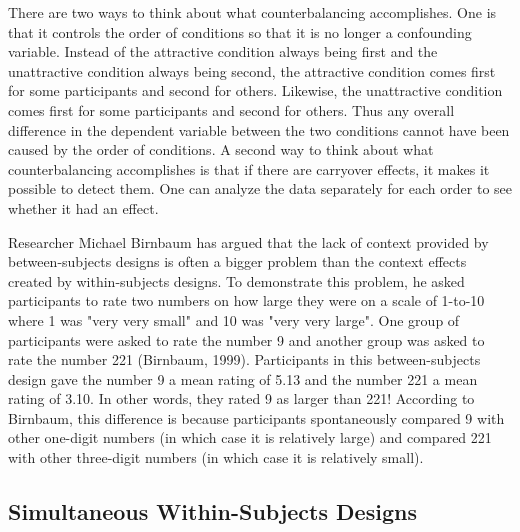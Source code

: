 There are two ways to think about what counterbalancing accomplishes. One is that it controls the order of conditions so that it is no longer a confounding variable. Instead of the attractive condition always being first and the unattractive condition always being second, the attractive condition comes first for some participants and second for others. Likewise, the unattractive condition comes first for some participants and second for others. Thus any overall difference in the dependent variable between the two conditions cannot have been caused by the order of conditions. A second way to think about what counterbalancing accomplishes is that if there are carryover effects, it makes it possible to detect them. One can analyze the data separately for each order to see whether it had an effect.

\color{fgcolor}\begin{kframe}
Researcher Michael Birnbaum has argued that the lack of context provided by between-subjects designs is often a bigger problem than the context effects created by within-subjects designs. To demonstrate this problem, he asked participants to rate two numbers on how large they were on a scale of 1-to-10 where 1 was "very very small" and 10 was "very very large". One group of participants were asked to rate the number 9 and another group was asked to rate the number 221 (Birnbaum, 1999). Participants in this between-subjects design gave the number 9 a mean rating of 5.13 and the number 221 a mean rating of 3.10. In other words, they rated 9 as larger than 221! According to Birnbaum, this difference is because participants spontaneously compared 9 with other one-digit numbers (in which case it is relatively large) and compared 221 with other three-digit numbers (in which case it is relatively small).
\end{kframe}

\subsection{Simultaneous Within-Subjects Designs}

